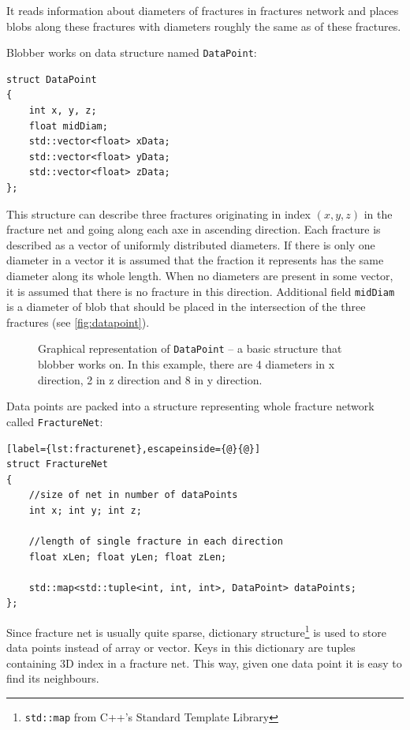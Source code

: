 It reads information about diameters of fractures in fractures network
and places blobs along these fractures with diameters roughly the same as of
these fractures.

Blobber works on data structure named \texttt{DataPoint}:

\begin{lstlisting}
struct DataPoint
{
  	int x, y, z;
	float midDiam;
	std::vector<float> xData;
	std::vector<float> yData;
	std::vector<float> zData;
};
\end{lstlisting}

This structure can describe three fractures originating in index $(x,y,z)$ in
the fracture net and going along each axe in ascending direction. Each fracture
is described as a vector of uniformly distributed diameters. If there is only
one diameter in a vector it is assumed that the fraction it represents has the
same diameter along its whole length. When no diameters are present in some
vector, it is assumed that there is no fracture in this direction.
Additional field \texttt{midDiam} is a diameter of blob that should be placed in
the intersection of the three fractures (see \autoref{fig:datapoint}).

\begin{figure}[hbp]
  \begin{center}
    
  \end{center}
  \caption{Graphical representation of \texttt{DataPoint} -- a basic structure that
blobber works on. In this example, there are 4 diameters in x direction,
2 in z direction and 8 in y direction.}
  \label{fig:datapoint}
\end{figure}

Data points are packed into a structure representing whole fracture network
called \texttt{FractureNet}:
\begin{lstlisting}[label={lst:fracturenet},escapeinside={@}{@}]
struct FractureNet
{
	//size of net in number of dataPoints
	int x; int y; int z;
	
	//length of single fracture in each direction
	float xLen; float yLen; float zLen;
	
	std::map<std::tuple<int, int, int>, DataPoint> dataPoints;
};
\end{lstlisting}

Since fracture net is usually quite sparse, dictionary structure\footnote{\texttt{std::map} from C++'s Standard Template Library}
is used to store data points instead of array or vector. Keys in this dictionary
are tuples containing 3D index in a fracture net. This way, given one data point
it is easy to find its neighbours.

